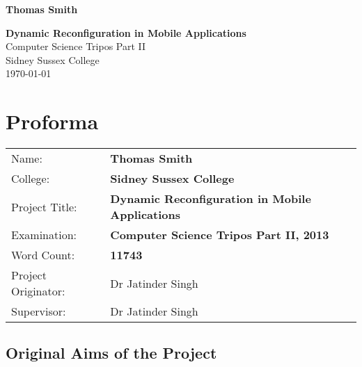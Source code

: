 \documentclass[12pt,twoside,notitlepage]{report}
\newcommand{\disstitle}{Dynamic Reconfiguration in Mobile Applications}
\newcommand{\wordcount}{11743}
\begin{document}


\pagestyle{empty}

\hfill{\LARGE \bf Thomas Smith}

\vspace*{60mm}
\begin{center}
\Huge
{\bf \disstitle} \\
\vspace*{5mm}
Computer Science Tripos Part II \\
\vspace*{5mm}
Sidney Sussex College \\
\vspace*{5mm}
\today  %
\end{center}

\cleardoublepage


\setcounter{page}{1}
\pagestyle{plain}

\chapter*{Proforma}

{\large
\begin{tabular}{l p{9.5cm}}
Name:               & \bf Thomas Smith	\\
College:            & \bf Sidney Sussex College	\\
Project Title:      & \bf \disstitle	\\
Examination:        & \bf Computer Science Tripos Part II, 2013 	\\
Word Count:         & \bf\wordcount\footnotemark[1] \\
Project Originator: & Dr Jatinder Singh		\\
Supervisor:         & Dr Jatinder Singh		\\ 
\end{tabular}
}



\section*{Original Aims of the Project}
\end{document}

